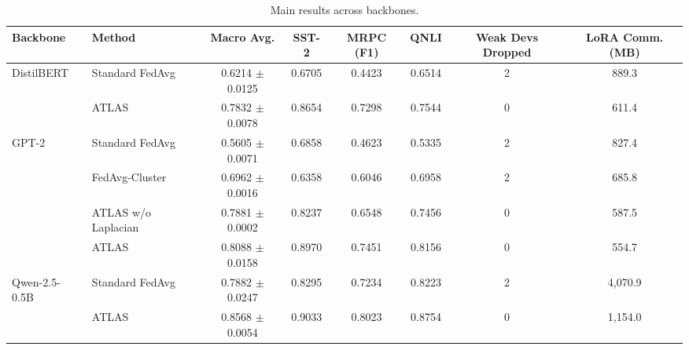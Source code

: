 \begin{table}[t]
\centering
\caption{Main results across backbones.}
\label{tab:main_results_all_models}
\begin{tabular}{llcccccc}
\toprule
\textbf{Backbone} & \textbf{Method} & \textbf{Macro Avg.} & \textbf{SST-2} & \textbf{MRPC (F1)} & \textbf{QNLI} & \textbf{Weak Devs Dropped} & \textbf{LoRA Comm. (MB)} \\
\midrule
DistilBERT & Standard FedAvg & 0.6214 $\pm$ 0.0125 & 0.6705 & 0.4423 & 0.6514 & 2 & 889.3 \\
 & ATLAS & 0.7832 $\pm$ 0.0078 & 0.8654 & 0.7298 & 0.7544 & 0 & 611.4 \\
\midrule
GPT-2 & Standard FedAvg & 0.5605 $\pm$ 0.0071 & 0.6858 & 0.4623 & 0.5335 & 2 & 827.4 \\
 & FedAvg-Cluster & 0.6962 $\pm$ 0.0016 & 0.6358 & 0.6046 & 0.6958 & 2 & 685.8 \\
 & ATLAS w/o Laplacian & 0.7881 $\pm$ 0.0002 & 0.8237 & 0.6548 & 0.7456 & 0 & 587.5 \\
 & ATLAS & 0.8088 $\pm$ 0.0158 & 0.8970 & 0.7451 & 0.8156 & 0 & 554.7 \\
\midrule
Qwen-2.5-0.5B & Standard FedAvg & 0.7882 $\pm$ 0.0247 & 0.8295 & 0.7234 & 0.8223 & 2 & 4,070.9 \\
 & ATLAS & 0.8568 $\pm$ 0.0054 & 0.9033 & 0.8023 & 0.8754 & 0 & 1,154.0 \\
\bottomrule
\end{tabular}
\end{table}

